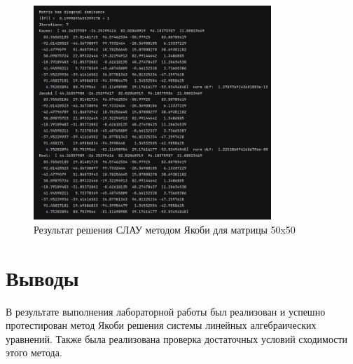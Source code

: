 \documentclass[a4paper, 14pt]{extarticle}
\begin{document}
\begin{figure}[H]
\centering
\includegraphics[width=0.8\textwidth]{images/res3.png}
\caption{Результат решения СЛАУ методом Якоби для матрицы 50x50}
\label{fig:img3}
\end{figure}


\section{Выводы}
В результате выполнения лабораторной работы был реализован и успешно протестирован метод Якоби решения системы линейных алгебраических уравнений. Также была реализована проверка достаточных условий сходимости этого метода.
\end{document}
